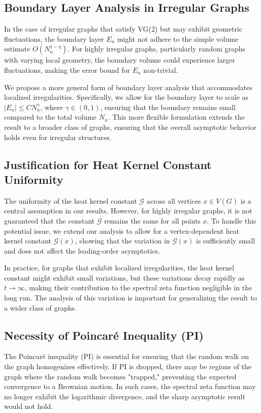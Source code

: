 \documentclass[11pt]{article}
\numberwithin{equation}{section}
\newcommand{\cG}{\mathcal{G}}
\begin{document}
\subsection{Boundary Layer Analysis in Irregular Graphs}
In the case of irregular graphs that satisfy VG(2) but may exhibit geometric fluctuations, the boundary layer $ E_n $ might not adhere to the simple volume estimate $ O(N_n^{1-\eta}) $. For highly irregular graphs, particularly random graphs with varying local geometry, the boundary volume could experience larger fluctuations, making the error bound for $ E_n $ non-trivial.

We propose a more general form of boundary layer analysis that accommodates localized irregularities. Specifically, we allow for the boundary layer to scale as $ |E_n| \leq C N_n^\gamma $, where $ \gamma \in (0,1) $, ensuring that the boundary remains small compared to the total volume $ N_n $. This more flexible formulation extends the result to a broader class of graphs, ensuring that the overall asymptotic behavior holds even for irregular structures.

\subsection{Justification for Heat Kernel Constant Uniformity}
The uniformity of the heat kernel constant $ \cG $ across all vertices $ x \in V(G) $ is a central assumption in our results. However, for highly irregular graphs, it is not guaranteed that the constant $ \cG $ remains the same for all points $ x $. To handle this potential issue, we extend our analysis to allow for a vertex-dependent heat kernel constant $ \cG(x) $, showing that the variation in $ \cG(x) $ is sufficiently small and does not affect the leading-order asymptotics.

In practice, for graphs that exhibit localized irregularities, the heat kernel constant might exhibit small variations, but these variations decay rapidly as $ t \to \infty $, making their contribution to the spectral zeta function negligible in the long run. The analysis of this variation is important for generalizing the result to a wider class of graphs.

\subsection{Necessity of Poincaré Inequality (PI)}
The Poincaré inequality (PI) is essential for ensuring that the random walk on the graph homogenizes effectively. If PI is dropped, there may be regions of the graph where the random walk becomes "trapped," preventing the expected convergence to a Brownian motion. In such cases, the spectral zeta function may no longer exhibit the logarithmic divergence, and the sharp asymptotic result would not hold.
\end{document}
